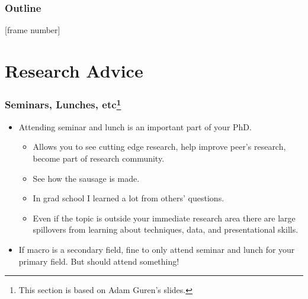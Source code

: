 \documentclass[english,xcolor=svgnames]{beamer}
\begin{document}




\begin{frame}
\frametitle{Outline}   
\tableofcontents[hideallsubsections] 
\end{frame}
\addtocounter{framenumber}{-1}
[frame number]{}


\section{Research Advice}

\begin{frame}
\frametitle[alignment=center]{Seminars, Lunches, etc\footnote{This section is based on Adam Guren's slides.}}
\begin{itemize}
	\item Attending seminar and lunch is an important part of your PhD.
	\begin{itemize}
		\item Allows you to see cutting edge research, help improve peer's research, become part of research community.
		\item See how the sausage is made.
		\item In grad school I learned a lot from others' questions.
		\item Even if the topic is outside your immediate research area there are large spillovers from learning about techniques, data, and presentational skills.
	\end{itemize}

	\item If macro is a secondary field, fine to only attend seminar and lunch for your primary field. But should attend something!
\end{itemize}
\end{frame}
\end{document}

